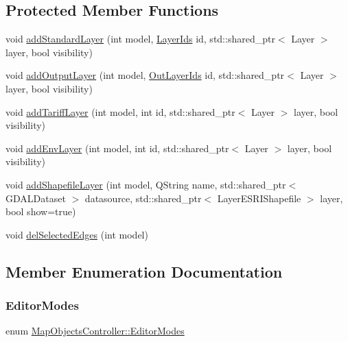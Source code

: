 \subsection*{Protected Member Functions}
\begin{DoxyCompactItemize}
\item 
void \mbox{\hyperlink{class_map_objects_controller_a27a8392f267b0e7c1978de6c91916fc7}{add\+Standard\+Layer}} (int model, \mbox{\hyperlink{class_map_objects_controller_a7233a767bfc22b69032e678b562253e2}{Layer\+Ids}} id, std\+::shared\+\_\+ptr$<$ Layer $>$ layer, bool visibility)
\item 
void \mbox{\hyperlink{class_map_objects_controller_a43019db3bf951ae4f15aebdf0c741ac4}{add\+Output\+Layer}} (int model, \mbox{\hyperlink{class_map_objects_controller_af07c270d29b28572a0665b55e3afb52c}{Out\+Layer\+Ids}} id, std\+::shared\+\_\+ptr$<$ Layer $>$ layer, bool visibility)
\item 
void \mbox{\hyperlink{class_map_objects_controller_aaf59f5257fbe71b23a1ca78f92a4931c}{add\+Tariff\+Layer}} (int model, int id, std\+::shared\+\_\+ptr$<$ Layer $>$ layer, bool visibility)
\item 
void \mbox{\hyperlink{class_map_objects_controller_ab78423edafb2d56632a11e5ec212d474}{add\+Env\+Layer}} (int model, int id, std\+::shared\+\_\+ptr$<$ Layer $>$ layer, bool visibility)
\item 
void \mbox{\hyperlink{class_map_objects_controller_a840529cf02bdd380c2a94792d1051c53}{add\+Shapefile\+Layer}} (int model, Q\+String name, std\+::shared\+\_\+ptr$<$ G\+D\+A\+L\+Dataset $>$ datasource, std\+::shared\+\_\+ptr$<$ Layer\+E\+S\+R\+I\+Shapefile $>$ layer, bool show=true)
\item 
void \mbox{\hyperlink{class_map_objects_controller_a0d765abab9f5ecfaf1ac34da9137e85f}{del\+Selected\+Edges}} (int model)
\end{DoxyCompactItemize}


\subsection{Member Enumeration Documentation}
\mbox{\label{class_map_objects_controller_a57082b858408bbc9d2b4f0f71853e687}} 
\subsubsection{\texorpdfstring{EditorModes}{EditorModes}}
{\footnotesize\ttfamily enum \mbox{\hyperlink{class_map_objects_controller_a57082b858408bbc9d2b4f0f71853e687}{Map\+Objects\+Controller\+::\+Editor\+Modes}}}

